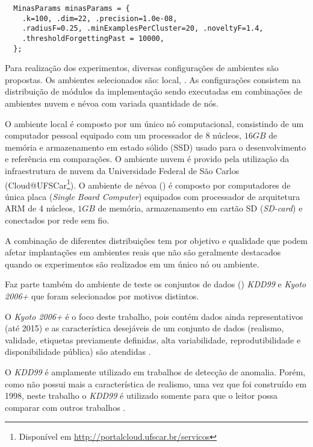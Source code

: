 \begin{lstlisting}
  MinasParams minasParams = {
    .k=100, .dim=22, .precision=1.0e-08,
    .radiusF=0.25, .minExamplesPerCluster=20, .noveltyF=1.4,
    .thresholdForgettingPast = 10000,
  };
\end{lstlisting}

Para realização dos experimentos, diversas configurações de ambientes são
propostas.
Os ambientes selecionados são: local, 
.
As configurações consistem na distribuição de módulos da implementação \mfog
sendo executadas em combinações de ambientes nuvem e névoa com variada
quantidade de nós.

O ambiente local é composto por um único nó computacional, consistindo de um
computador pessoal equipado com um processador de 8 núcleos, $16GB$ de memória e
armazenamento em estado sólido (SSD) usado para o desenvolvimento e referência
em comparações.
O ambiente nuvem é provido pela utilização da infraestrutura de nuvem da
Universidade Federal de São Carlos (Cloud{@}UFSCar\footnote{Disponível em
\url{http://portalcloud.ufscar.br/servicos}}).
O ambiente de névoa (\fog) é composto por computadores de única placa
(\emph{Single Board Computer}) equipados com processador de arquitetura ARM de 4
núcleos, $1GB$ de memória, armazenamento em cartão SD (\emph{SD-card}) e
conectados por rede sem fio.

A combinação de diferentes distribuições tem por objetivo  e qualidade que podem afetar implantações em ambientes reais que não
são geralmente destacados quando os experimentos são realizados em um único
nó ou ambiente.

Faz parte também do ambiente de teste os conjuntos de dados (\datasets)
\emph{KDD99}
e \emph{Kyoto 2006+}
que foram selecionados por motivos distintos.

O \dataset \emph{Kyoto 2006+} é o foco deste trabalho, pois contém dados ainda
representativos (até 2015) e as característica desejáveis de um conjunto de
dados (realismo, validade, etiquetas previamente definidas, alta variabilidade,
reprodutibilidade e disponibilidade pública) são atendidas
\cite{KyotoDataset,Song2011kyoto}.

O \dataset \emph{KDD99} é amplamente utilizado em trabalhos de detecção de
anomalia.
Porém, como não possui mais a característica de realismo, uma vez que foi
construído em 1998, neste trabalho o \dataset \emph{KDD99} é utilizado somente
para que o leitor possa comparar com outros trabalhos
\cite{Tavallaee2009,Protic2018KddKyoto}.

